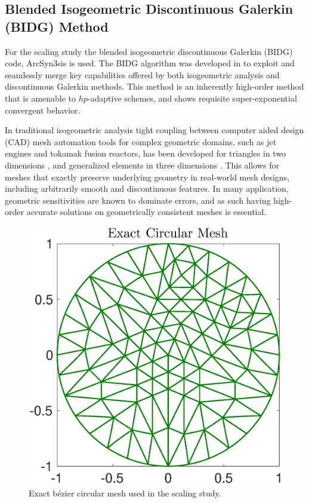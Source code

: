\subsection{Blended Isogeometric Discontinuous Galerkin (BIDG) Method}
\label{sec:isogeometric}

For the scaling study the blended isogeometric discontinuous Galerkin (BIDG) code, ArcSyn3sis is used.  The BIDG algorithm was developed in \cite{Michoski2016658} to exploit and seamlessly merge key capabilities offered by both isogeometric analysis and discontinuous Galerkin methods. This method is an inherently high-order method that is amenable to $hp$-adaptive schemes, and shows requisite super-exponential convergent behavior.

In traditional isogeometric analysis tight coupling between computer aided design (CAD) mesh automation tools for complex geometric domains, such as jet engines and tokamak fusion reactors, has been developed for triangles in two dimensions \cite{Engvall2016378}, and generalized elements in three dimensions \cite{EngvallPress}.  This allows for meshes that exactly preserve underlying geometry in real-world mesh designs, including arbitrarily smooth and discontinuous features.  In many application, geometric sensitivities are known to dominate errors, and as such having high-order accurate solutions on geometrically consistent meshes is essential.


\begin{figure}[h]
\begin{center}
\includegraphics[width=0.8\linewidth]{./bidg_data/168_circ}
\end{center}
\vspace*{-.5cm}
\caption{Exact b\'{e}zier circular mesh used in the scaling study.}
\label{fig:dns_scaling}
\end{figure}


